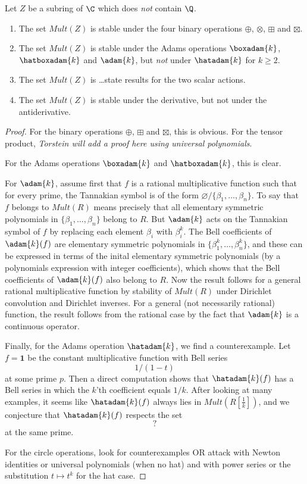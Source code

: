 \documentclass[a4paper]{article}
\begin{document}
\begin{theorem}
Let $Z$ be a subring of $\C$ which does \emph{not} contain $\Q$.
\begin{enumerate}
\item The set $Mult(Z)$ is stable under the four binary operations $\oplus$, $\otimes$, $\boxplus$ and $\boxtimes$.
\item The set $Mult(Z)$ is stable under the Adams operations $\boxadam{k}$, $\hatboxadam{k}$ and $\adam{k}$, but \emph{not} under $\hatadam{k}$ for $k \geq 2$. 
\item The set $Mult(Z)$ is \ldots state results for the two scalar actions.
\item The set $Mult(Z)$ is stable under the derivative, but not under the antiderivative.
\end{enumerate}
\end{theorem}

\begin{proof}
For the binary operations $\oplus$, $\boxplus$ and $\boxtimes$, this is obvious. For the tensor product, \emph{Torstein will add a proof here using universal polynomials}. 

For the Adams operations $\boxadam{k}$ and $\hatboxadam{k}$, this is clear. 

For $\adam{k}$, assume first that $f$ is a rational multiplicative function such that for every prime, the Tannakian symbol is of the form $ \varnothing / \{ \beta_1, \ldots, \beta_n  \}$. To say that $f$ belongs to $Mult(R)$ means precisely that all elementary symmetric polynomials in $\{ \beta_1, \ldots, \beta_n  \}$ belong to $R$. But $\adam{k}$ acts on the Tannakian symbol of $f$ by replacing each element $\beta_i$ with $\beta_i^k$. The Bell coefficients of $\adam{k}(f)$ are elementary symmetric polynomials in $\{ \beta_1^k, \ldots, \beta_n^k  \}$, and these can be expressed in terms of the inital elementary symmetric polynomials (by a polynomials expression with integer coefficients), which shows that the Bell coefficients of $\adam{k}(f)$ also belong to $R$. 
Now the result follows for a general rational multiplicative function by stability of $Mult(R)$ under Dirichlet convolution and Dirichlet inverses. For a general (not necessarily rational) function, the result follows from the rational case by the fact that $\adam{k}$ is a continuous operator.

Finally, for the Adams operation $\hatadam{k}$, we find a counterexample. Let $f = \mathbf{1}$ be the constant multiplicative function with Bell series
$$  1 / (1-t) $$
at some prime $p$. Then a direct computation shows that $\hatadam{k}(f)$ has a Bell series in which the $k$'th coefficient equals $1/k$. After looking at many examples, it seems like $\hatadam{k}(f)$ always lies in $Mult(R [\frac{1}{k}])$, and we conjecture that $\hatadam{k}(f)$ respects the set 
$$   ? $$
at the same prime.


For the circle operations, look for counterexamples OR attack with Newton identities or universal polynomials (when no hat) and with power series or the substitution $t \mapsto t^k$ for the hat case.


\end{proof}
\end{document}
